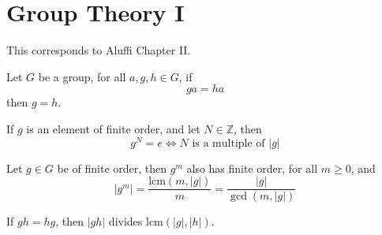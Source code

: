 \documentclass[openany]{book}
\begin{document}







\chapter{Group Theory I}
This corresponds to Aluffi Chapter II.

\begin{prop}
    Let $G$ be a group, for all $a,g,h\in G$, if 
    \begin{equation*}
        ga=ha
    \end{equation*}
    then $g=h$.
\end{prop}


\begin{cor}
    If $g$ is an element of finite order, and let $N\in\mathbb{Z}$, then 
    \begin{equation*}
        g^N=e \iff N \text{ is a multiple of }|g|
    \end{equation*}
\end{cor}

\begin{prop}
    Let $g\in G$ be of finite order, then $g^m$ also has finite order, for all $m\geq 0$, and 
    \begin{equation*}
        \left|g^m\right|=\frac{\text{lcm}(m,|g|)}{m}=\frac{|g|}{\gcd(m,|g|)}
    \end{equation*}
\end{prop}

\begin{prop}
    If $gh=hg$, then $|gh|$ divides $\text{lcm}(|g|,|h|)$.
\end{prop}
\end{document}
